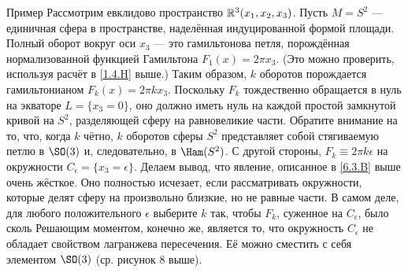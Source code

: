 \begin{ex}{Пример}\label{6.3.C}
Рассмотрим евклидово пространство $\mathbb{R}^3 (x_1, x_2, x_3)$.
Пусть $M = S^2$ --- единичная сфера в пространстве, наделённая
индуцированной формой площади. 
Полный оборот вокруг оси $x_3$ --- это гамильтонова петля, порождённая
нормализованной функцией Гамильтона $F_1 (x) = 2\pi x_3$. 
(Это можно проверить, используя расчёт в \ref{1.4.H} выше.)
Таким образом, $k$ оборотов порождается гамильтонианом $F_k (x) = 2\pi k x_3$.
Поскольку $F_k$ тождественно обращается в нуль на экваторе $L = \{x_3
= 0\}$, оно должно иметь нуль на каждой простой
замкнутой кривой на $S^2$, разделяющей сферу на равновеликие части. 
Обратите внимание на то, что, когда $k$ чётно, $k$ оборотов сферы
$S^2$ представляет собой стягиваемую петлю в $\SO (3)$ и,
следовательно, в $\Ham (S^2)$. 
С другой стороны, $F_k \equiv 2\pi k\epsilon$ на окружности
$C_\epsilon = \{x_3 = \epsilon\}$. 
Делаем вывод, что явление, описанное в \ref{6.3.B} выше очень жёсткое.
Оно полностью исчезает, если рассматривать окружности, которые делят
сферу на произвольно близкие, но не равные части. 
В самом деле, для любого положительного $\epsilon$ выберите $k$ так,
чтобы $F_k$, суженное на $C_\epsilon$, было сколь 
Решающим моментом, конечно же, является то, что окружность
$C_\epsilon$ не обладает свойством лагранжева пересечения. 
Её можно сместить с себя элементом $\SO (3)$ (ср. рисунок 8 выше). 
\end{ex}
